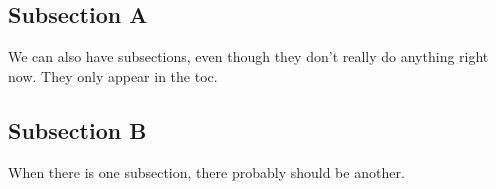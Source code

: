 \documentclass[final]{beamer}
\begin{document}
\subsection{Subsection A}
\begin{frame}{\mbox{}}
  We can also have subsections, even though they don't really do
  anything right now. They only appear in the toc.
\end{frame}
%
%
%
%
%
\subsection{Subsection B}
\begin{frame}{\mbox{}}
  When there is one subsection, there probably should be another.
\end{frame}
%
%
%
%
%
\end{document}
